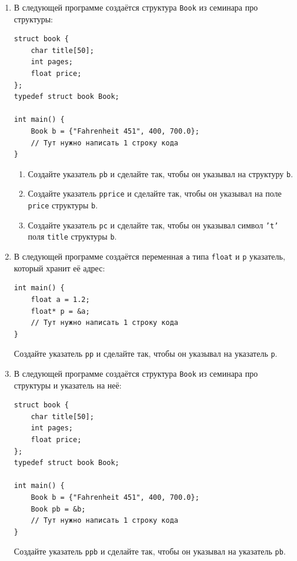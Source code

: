 \documentclass{article}
\begin{document}
\begin{enumerate}
\newpage
\item В следующей программе создаётся структура \texttt{Book} из семинара про структуры:
\begin{lstlisting}
struct book {
    char title[50];
    int pages;
    float price;
};
typedef struct book Book;

int main() {
    Book b = {"Fahrenheit 451", 400, 700.0};
    // Тут нужно написать 1 строку кода
}
\end{lstlisting}

\begin{enumerate}
\item Создайте указатель \texttt{pb} и сделайте так, чтобы он указывал на структуру \texttt{b}.
\item Создайте указатель \texttt{pprice} и сделайте так, чтобы он указывал на поле \texttt{price} структуры \texttt{b}.
\item Создайте указатель \texttt{pc} и сделайте так, чтобы он указывал символ \texttt{'t'} поля \texttt{title} структуры \texttt{b}.
\end{enumerate} 


\item В следующей программе создаётся переменная \texttt{a} типа \texttt{float} и \texttt{p} указатель, который хранит её адрес:
\begin{lstlisting}
int main() {
    float a = 1.2;
    float* p = &a;
    // Тут нужно написать 1 строку кода
}
\end{lstlisting}
Создайте указатель \texttt{pp} и сделайте так, чтобы он указывал на указатель \texttt{p}.


\item В следующей программе создаётся структура \texttt{Book} из семинара про структуры и указатель на неё:
\begin{lstlisting}
struct book {
    char title[50];
    int pages;
    float price;
};
typedef struct book Book;

int main() {
    Book b = {"Fahrenheit 451", 400, 700.0};
    Book pb = &b;
    // Тут нужно написать 1 строку кода
}
\end{lstlisting}
Создайте указатель \texttt{ppb} и сделайте так, чтобы он указывал на указатель \texttt{pb}.


\end{enumerate}

\newpage
\end{document}
